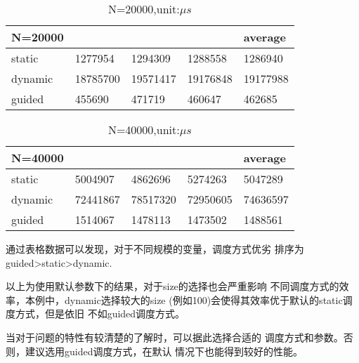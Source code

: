 \documentclass{ctexart}
\begin{document}
\begin{enumerate}[label=(\alph*)]
        \begin{table}[]
            \centering
            \caption{N=20000,unit:$\mu s$}
            \label{my-label}
            \begin{tabular}{@{}lllll@{}}
                \toprule
                N=20000 &          &          &          & average  \\ \midrule
                static  & 1277954  & 1294309  & 1288558  & 1286940  \\
                dynamic & 18785700 & 19571417 & 19176848 & 19177988 \\
                guided  & 455690   & 471719   & 460647   & 462685   \\ \bottomrule
            \end{tabular}
        \end{table}


        \begin{table}[]
            \centering
            \caption{N=40000,unit:$\mu s$}
            \label{my-label}
            \begin{tabular}{@{}lllll@{}}
                \toprule
                N=40000 &          &          &          & average  \\ \midrule
                static  & 5004907  & 4862696  & 5274263  & 5047289  \\
                dynamic & 72441867 & 78517320 & 72950605 & 74636597 \\
                guided  & 1514067  & 1478113  & 1473502  & 1488561  \\ \bottomrule
            \end{tabular}
        \end{table}

        
        通过表格数据可以发现，对于不同规模的变量，调度方式优劣
        排序为guided>static>dynamic.
        
        以上为使用默认参数下的结果，对于size的选择也会严重影响
        不同调度方式的效率，本例中，dynamic选择较大的size
        (例如100)会使得其效率优于默认的static调度方式，但是依旧
        不如guided调度方式。

        当对于问题的特性有较清楚的了解时，可以据此选择合适的
        调度方式和参数。否则，建议选用guided调度方式，在默认
        情况下也能得到较好的性能。

\end{enumerate}
\end{document}

